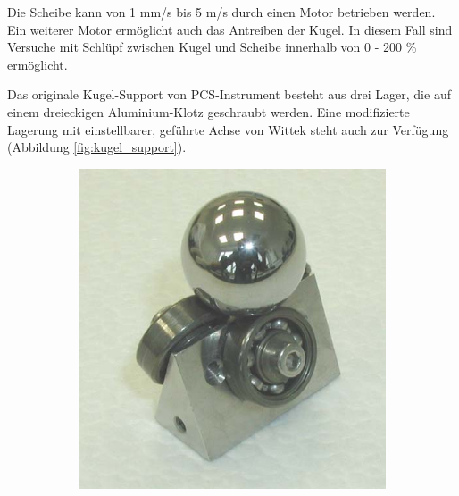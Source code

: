 Die Scheibe kann von 1 mm/s bis 5 m/s durch einen Motor betrieben werden.
Ein weiterer Motor ermöglicht auch das Antreiben der Kugel.
In diesem Fall sind Versuche mit Schlüpf zwischen Kugel und Scheibe innerhalb von 0 - 200 \% ermöglicht.

Das originale Kugel-Support von PCS-Instrument besteht aus drei Lager, die auf einem dreieckigen Aluminium-Klotz geschraubt werden.
Eine modifizierte Lagerung mit einstellbarer, geführte Achse von Wittek \cite{wittek_2007} steht auch zur Verfügung (Abbildung \ref{fig:kugel_support}).
\begin{figure}[htb]
    \centering

    \begin{subfigure}[b]{0.3\textwidth}
        \includegraphics[width=\textwidth]{./images/kugel-support_original.png}
    \end{subfigure}
    \begin{subfigure}[b]{0.3\textwidth}

\end{subfigure}
\end{figure}
